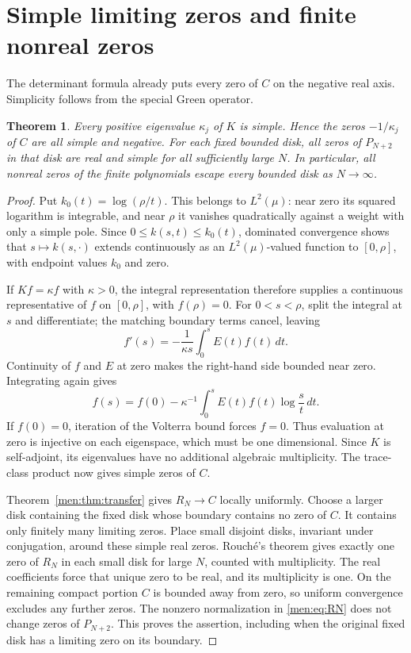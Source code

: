 \documentclass[11pt,letterpaper]{article}
\newtheorem{theorem}{Theorem}[section]
\theoremstyle{remark}\newtheorem{remark}[theorem]{Remark}
\begin{document}
\section{Simple limiting zeros and finite nonreal zeros}\label{men:sec:zeros}
The determinant formula already puts every zero of $C$ on the negative real axis. Simplicity follows from the special Green operator.

\begin{theorem}\label{men:thm:zeros}
Every positive eigenvalue $\kappa_j$ of $K$ is simple. Hence the zeros $-1/\kappa_j$ of $C$ are all simple and negative. For each fixed bounded disk, all zeros of $P_{N+2}$ in that disk are real and simple for all sufficiently large $N$. In particular, all nonreal zeros of the finite polynomials escape every bounded disk as $N\to\infty$.
\end{theorem}
\begin{proof}
Put $k_0(t)=\log(\rho/t)$. This belongs to $L^2(\mu)$: near zero its squared logarithm is integrable, and near $\rho$ it vanishes quadratically against a weight with only a simple pole. Since $0\le k(s,t)\le k_0(t)$, dominated convergence shows that $s\mapsto k(s,\cdot)$ extends continuously as an $L^2(\mu)$-valued function to $[0,\rho]$, with endpoint values $k_0$ and zero.

If $Kf=\kappa f$ with $\kappa>0$, the integral representation therefore supplies a continuous representative of $f$ on $[0,\rho]$, with $f(\rho)=0$. For $0<s<\rho$, split the integral at $s$ and differentiate; the matching boundary terms cancel, leaving
\begin{equation}\label{men:eq:eigenderivative}
 f'(s)=-\frac1{\kappa s}\int_0^s E(t)f(t)\,dt.
\end{equation}
Continuity of $f$ and $E$ at zero makes the right-hand side bounded near zero. Integrating again gives
\begin{equation}\label{men:eq:eigenvolterra}
 f(s)=f(0)-\kappa^{-1}\int_0^s E(t)f(t)\log\frac st\,dt.
\end{equation}
If $f(0)=0$, iteration of the Volterra bound forces $f=0$. Thus evaluation at zero is injective on each eigenspace, which must be one dimensional. Since $K$ is self-adjoint, its eigenvalues have no additional algebraic multiplicity. The trace-class product now gives simple zeros of $C$.

Theorem~\ref{men:thm:transfer} gives $R_N\to C$ locally uniformly. Choose a larger disk containing the fixed disk whose boundary contains no zero of $C$. It contains only finitely many limiting zeros. Place small disjoint disks, invariant under conjugation, around these simple real zeros. Rouch\'e's theorem gives exactly one zero of $R_N$ in each small disk for large $N$, counted with multiplicity. The real coefficients force that unique zero to be real, and its multiplicity is one. On the remaining compact portion $C$ is bounded away from zero, so uniform convergence excludes any further zeros. The nonzero normalization in \eqref{men:eq:RN} does not change zeros of $P_{N+2}$. This proves the assertion, including when the original fixed disk has a limiting zero on its boundary.
\end{proof}
\end{document}
